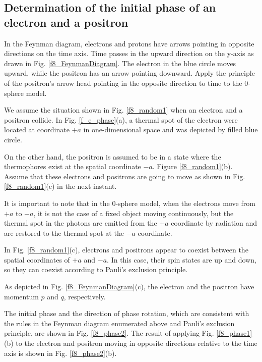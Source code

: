 \documentclass[%
 reprint,
 amsmath,amssymb,
 aps,
]{revtex4-1}
\numberwithin{equation}{section}%
\begin{document}
\subsection{Determination of the initial phase of an electron and a positron}
\label{Determination of the initial phase of an electron and a positron}


In the Feynman diagram, electrons and protons have arrows pointing in opposite directions on the time axis. Time passes in the upward direction on the y-axis as drawn in Fig. \ref{f8_FeynmanDiagram}. The electron in the blue circle moves upward, while the positron has an arrow pointing downward. Apply the principle of the positron's arrow head pointing in the opposite direction to time to the 0-sphere model.


We assume the situation shown in Fig. \ref{f8_random1} when an electron and a positron collide. In Fig. \ref{f_e_phase}(a), a thermal spot of the electron were located at coordinate $+a$ in one-dimensional space and was depicted by filled blue circle.


On the other hand, the positron is assumed to be in a state where the thermophores exist at the spatial coordinate $-a$. Figure \ref{f8_random1}(b). Assume that these electrons and positrons are going to move as shown in Fig. \ref{f8_random1}(c) in the next instant.


It is important to note that in the 0-sphere model, when the electrons move from $+a$ to $-a$, it is not the case of a fixed object moving continuously, but the thermal spot in the photons are emitted from the $+a$ coordinate by radiation and are restored to the thermal spot at the $-a$ coordinate.


In Fig. \ref{f8_random1}(c), electrons and positrons appear to coexist between the spatial coordinates of $+a$ and $-a$. In this case, their spin states are up and down, so they can coexist according to Pauli's exclusion principle.


As depicted in Fig. \ref{f8_FeynmanDiagram}(c), the electron and the positron have momentum $p$ and $q$, respectively. 


The initial phase and the direction of phase rotation, which are consistent with the rules in the Feynman diagram enumerated above and Pauli's exclusion principle, are shown in Fig. \ref{f8_phase2}. The result of applying Fig. \ref{f8_phase1}(b) to the electron and positron moving in opposite directions relative to the time axis is shown in Fig. \ref{f8_phase2}(b).
\end{document}
